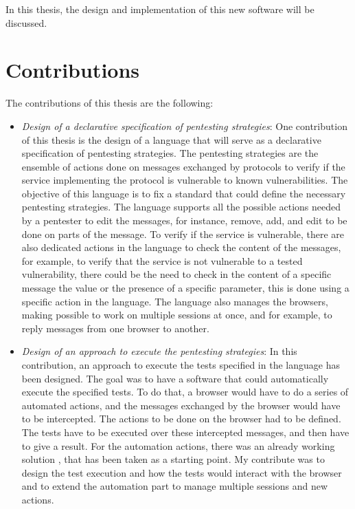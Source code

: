 In this thesis, the design and implementation of this new software will be discussed.

\section{Contributions}
\label{sec:contributions}
The contributions of this thesis are the following:
\begin{itemize}
    \item \textit{Design of a declarative specification of pentesting strategies}: One contribution of this thesis is the design of a language that will serve as a declarative specification of pentesting strategies. The pentesting strategies are the ensemble of actions done on messages exchanged by protocols to verify if the service implementing the protocol is vulnerable to known vulnerabilities. The objective of this language is to fix a standard that could define the necessary pentesting strategies. The language supports all the possible actions needed by a pentester to edit the messages, for instance, remove, add, and edit to be done on parts of the message. To verify if the service is vulnerable, there are also dedicated actions in the language to check the content of the messages, for example, to verify that the service is not vulnerable to a tested vulnerability, there could be the need to check in the content of a specific message the value or the presence of a specific parameter, this is done using a specific action in the language. The language also manages the browsers, making possible to work on multiple sessions at once, and for example, to reply messages from one browser to another.
    \item \textit{Design of an approach to execute the pentesting strategies}: In this contribution, an approach to execute the tests specified in the language has been designed. The goal was to have a software that could automatically execute the specified tests. To do that, a browser would have to do a series of automated actions, and the messages exchanged by the browser would have to be intercepted. The actions to be done on the browser had to be defined. The tests have to be executed over these intercepted messages, and then have to give a result. For the automation actions, there was an already working solution \cite{wendy_barreto, claudio_grisenti}, that has been taken as a starting point. My contribute was to design the test execution and how the tests would interact with the browser and to extend the automation part to manage multiple sessions and new actions.

\end{itemize}
